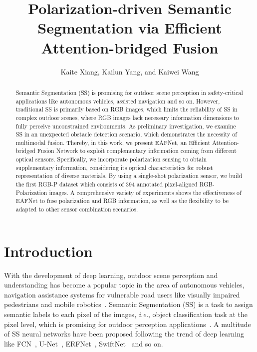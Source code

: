 \documentclass{osa-article}
\begin{document}
\title{Polarization-driven Semantic Segmentation via Efficient Attention-bridged Fusion}


\author{Kaite Xiang, Kailun Yang, and Kaiwei Wang}

\address{
State Key Laboratory of Modern Optical Instrumentation, Zhejiang University, Hangzhou 310027, China\\
Institute for Anthropomatics and Robotics, Karlsruhe Institute of Technology, 76131 Karlsruhe, Germany\\
National Engineering Research Center of Optical Instrumentation, Zhejiang University, Hangzhou 310058, China\\
}






\begin{abstract}
Semantic Segmentation (SS) is promising for outdoor scene perception in safety-critical applications like autonomous vehicles, assisted navigation and so on.
However, traditional SS is primarily based on RGB images, which limits the reliability of SS in complex outdoor scenes, where RGB images lack necessary information dimensions to fully perceive unconstrained environments.
As preliminary investigation, we examine SS in an unexpected obstacle detection scenario, which demonstrates the necessity of multimodal fusion.
Thereby, in this work, we present EAFNet, an Efficient Attention-bridged Fusion Network to exploit complementary information coming from different optical sensors.
Specifically, we incorporate polarization sensing to obtain supplementary information, considering its optical characteristics for robust representation of diverse materials.
By using a single-shot polarization sensor, we build the first RGB-P dataset which consists of 394 annotated pixel-aligned RGB-Polarization images.
A comprehensive variety of experiments shows the effectiveness of EAFNet to fuse polarization and RGB information, as well as the flexibility to be adapted to other sensor combination scenarios.
\end{abstract}

\section{Introduction}
With the development of deep learning, outdoor scene perception and understanding has become a popular topic in the area of autonomous vehicles, navigation assistance systems for vulnerable road users like visually impaired pedestrians and mobile robotics~\cite{yang2018predicting}.
Semantic Segmentation (SS) is a task to assign semantic labels to each pixel of the images, \textit{i.e.}, object classification task at the pixel level, which is promising for outdoor perception applications~\cite{feng2020deep}.
A multitude of SS neural networks have been proposed following the trend of deep learning like FCN~\cite{long2015fully}, U-Net~\cite{ronneberger2015u}, ERFNet~\cite{romera2018erfnet}, SwiftNet~\cite{orvsic2019defense} and so on.
\end{document}

